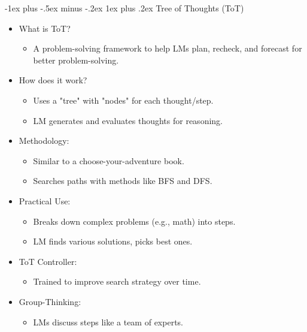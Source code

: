 \documentclass[10pt,landscape]{article}
\makeatletter
\renewcommand{\subsection}{\@startsection{subsection}{2}{0mm}%
                                {-1explus -.5ex minus -.2ex}%
                                {0.5ex plus .2ex}%
                                {\normalfont\normalsize\bfseries}}
\renewcommand{\subsection}{\@startsection{subsection}{3}{0mm}%
                                {-1ex plus -.5ex minus -.2ex}%
                                {1ex plus .2ex}%
                                {\normalfont\small\bfseries}}
\makeatother
\begin{document}
\begin{multicols}{3}
\subsection{Tree of Thoughts (ToT)}
\begin{itemize}
    \item What is ToT?
    \begin{itemize}
        \item A problem-solving framework to help LMs plan, recheck, and forecast for better problem-solving.
    \end{itemize}
    \item How does it work?
    \begin{itemize}
        \item Uses a "tree" with "nodes" for each thought/step.
        \item LM generates and evaluates thoughts for reasoning.
    \end{itemize}
    \item Methodology:
    \begin{itemize}
        \item Similar to a choose-your-adventure book.
        \item Searches paths with methods like BFS and DFS.
    \end{itemize}
    \item Practical Use:
    \begin{itemize}
        \item Breaks down complex problems (e.g., math) into steps.
        \item LM finds various solutions, picks best ones.
    \end{itemize}
    \item ToT Controller:
    \begin{itemize}
        \item Trained to improve search strategy over time.
    \end{itemize}
    \item Group-Thinking:
    \begin{itemize}
        \item LMs discuss steps like a team of experts.
    \end{itemize}
\end{itemize}


\end{multicols}
\end{document}
